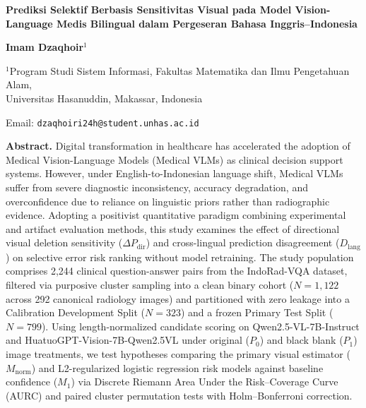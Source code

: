\documentclass[a4paper,10pt,twoside]{article}
\begin{document}
\thispagestyle{firstpage}

\vspace*{0.5cm}

\begin{center}
    {\large\bfseries Prediksi Selektif Berbasis Sensitivitas Visual pada Model Vision-Language Medis Bilingual dalam Pergeseran Bahasa Inggris--Indonesia\par}
    \vspace{1.2em}
    {\normalsize\bfseries Imam Dzaqhoir$^1$\par}
    \vspace{0.8em}
    {\footnotesize $^1$Program Studi Sistem Informasi, Fakultas Matematika dan Ilmu Pengetahuan Alam,\\ Universitas Hasanuddin, Makassar, Indonesia\par}
    {\footnotesize Email: \texttt{dzaqhoiri24h@student.unhas.ac.id}\par}
\end{center}

\vspace{1em}

\noindent\textbf{Abstract.} Digital transformation in healthcare has accelerated the adoption of Medical Vision-Language Models (Medical VLMs) as clinical decision support systems. However, under English-to-Indonesian language shift, Medical VLMs suffer from severe diagnostic inconsistency, accuracy degradation, and overconfidence due to reliance on linguistic priors rather than radiographic evidence. Adopting a positivist quantitative paradigm combining experimental and artifact evaluation methods, this study examines the effect of directional visual deletion sensitivity ($\Delta P_{\mathrm{dir}}$) and cross-lingual prediction disagreement ($D_{\mathrm{lang}}$) on selective error risk ranking without model retraining. The study population comprises 2,244 clinical question-answer pairs from the IndoRad-VQA dataset, filtered via purposive cluster sampling into a clean binary cohort ($N = 1{,}122$ across 292 canonical radiology images) and partitioned with zero leakage into a Calibration Development Split ($N = 323$) and a frozen Primary Test Split ($N = 799$). Using length-normalized candidate scoring on Qwen2.5-VL-7B-Instruct and HuatuoGPT-Vision-7B-Qwen2.5VL under original ($P_0$) and black blank ($P_1$) image treatments, we test hypotheses comparing the primary visual estimator ($M_{\mathrm{norm}}$) and L2-regularized logistic regression risk models against baseline confidence ($M_1$) via Discrete Riemann Area Under the Risk--Coverage Curve (AURC) and paired cluster permutation tests with Holm--Bonferroni correction.
\end{document}
